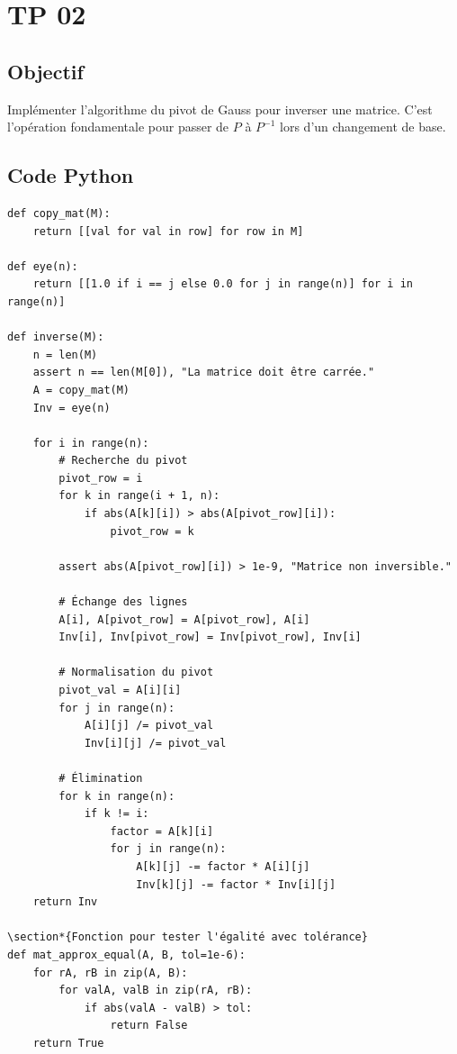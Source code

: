 \documentclass{report}
\begin{document}
\section*{TP 02}
\subsection*{Objectif}
Implémenter l'algorithme du pivot de Gauss pour inverser une matrice. C'est l'opération fondamentale pour passer de $P$ à $P^{-1}$ lors d'un changement de base.
\subsection*{Code Python}
\begin{verbatim}
def copy_mat(M):
    return [[val for val in row] for row in M]

def eye(n):
    return [[1.0 if i == j else 0.0 for j in range(n)] for i in range(n)]

def inverse(M):
    n = len(M)
    assert n == len(M[0]), "La matrice doit être carrée."
    A = copy_mat(M)
    Inv = eye(n)

    for i in range(n):
        # Recherche du pivot
        pivot_row = i
        for k in range(i + 1, n):
            if abs(A[k][i]) > abs(A[pivot_row][i]):
                pivot_row = k

        assert abs(A[pivot_row][i]) > 1e-9, "Matrice non inversible."

        # Échange des lignes
        A[i], A[pivot_row] = A[pivot_row], A[i]
        Inv[i], Inv[pivot_row] = Inv[pivot_row], Inv[i]

        # Normalisation du pivot
        pivot_val = A[i][i]
        for j in range(n):
            A[i][j] /= pivot_val
            Inv[i][j] /= pivot_val

        # Élimination
        for k in range(n):
            if k != i:
                factor = A[k][i]
                for j in range(n):
                    A[k][j] -= factor * A[i][j]
                    Inv[k][j] -= factor * Inv[i][j]
    return Inv

\section*{Fonction pour tester l'égalité avec tolérance}
def mat_approx_equal(A, B, tol=1e-6):
    for rA, rB in zip(A, B):
        for valA, valB in zip(rA, rB):
            if abs(valA - valB) > tol:
                return False
    return True


\end{verbatim}
\end{document}
